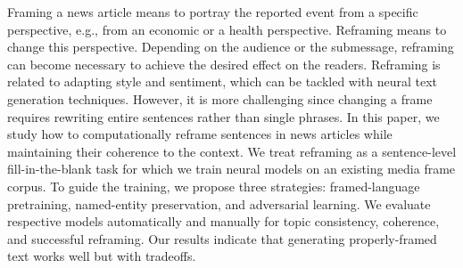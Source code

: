 Framing a news article means to portray the reported event from a specific perspective, e.g., from an economic or a health perspective. Reframing means to change this perspective. Depending on the audience or the submessage, reframing can become necessary to achieve the desired effect on the readers. Reframing is related to adapting style and sentiment, which can be tackled with neural text generation techniques. However, it is more challenging since changing a frame requires rewriting entire sentences rather than single phrases. In this paper, we study how to computationally reframe sentences in news articles while maintaining their coherence to the context. We treat reframing as a sentence-level fill-in-the-blank task for which we train neural models on an existing media frame corpus. To guide the training, we propose three strategies: framed-language pretraining, named-entity preservation, and adversarial learning. We evaluate respective models automatically and manually for topic consistency, coherence, and successful reframing. Our results indicate that generating properly-framed text works well but with tradeoffs.

